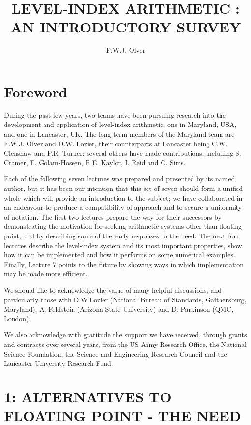 \documentclass[10pt]{article}
\title{LEVEL-INDEX ARITHMETIC : AN INTRODUCTORY SURVEY }
\author{F.W.J. Olver}
\date{}
\begin{document}
\maketitle
\captionsetup{singlelinecheck=false}


\section*{Foreword}
During the past few years, two teams have been pursuing research into the development and application of level-index arithmetic, one in Maryland, USA, and one in Lancaster, UK. The long-term members of the Maryland team are F.W.J. Olver and D.W. Lozier, their counterparts at Lancaster being C.W. Clenshaw and P.R. Turner: several others have made contributions, including S. Cramer, F. Golam-Hossen, R.E. Kaylor, I. Reid and C. Sims.

Each of the following seven lectures was prepared and presented by its named author, but it has been our intention that this set of seven should form a unified whole which will provide an introduction to the subject; we have collaborated in an endeavour to produce a compatibility of approach and to secure a uniformity of notation. The first two lectures prepare the way for their successors by demonstrating the motivation for seeking arithmetic systems other than floating point, and by describing some of the early responses to the need. The next four lectures describe the level-index system and its most important properties, show how it can be implemented and how it performs on some numerical examples. Finally, Lecture 7 points to the future by showing ways in which implementation may be made more efficient.

We should like to acknowledge the value of many helpful discussions, and particularly those with D.W.Lozier (National Bureau of Standards, Gaithersburg, Maryland), A. Feldstein (Arizona State University) and D. Parkinson (QMC, London).

We also acknowledge with gratitude the support we have received, through grants and contracts over several years, from the US Army Research Office, the National Science Foundation, the Science and Engineering Research Council and the Lancaster University Research Fund.

\section*{1: ALTERNATIVES TO FLOATING POINT - THE NEED }
\end{document}
